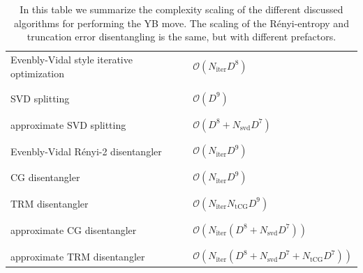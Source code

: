 \begin{table}
	\begin{tabular}{ l | l }
		Evenbly-Vidal style iterative optimization & $\mathcal{O}(N_\text{iter}D^8)$ \\ \\[-1em]
		\hline \\[-1em]
		SVD splitting & $\mathcal{O}(D^9)$ \\ \\[-1em]
		\hline \\[-1em]
		approximate SVD splitting & $\mathcal{O}(D^8 + N_\text{svd}D^7)$ \\ \\[-1em]
		\hline
		\hline \\[-1em]
		Evenbly-Vidal Rényi-2 disentangler  & $\mathcal{O}(N_\text{iter}D^9)$ \\ \\[-1em]
		\hline \\[-1em]
		CG disentangler & $\mathcal{O}(N_\text{iter}D^9)$ \\ \\[-1em]
		\hline \\[-1em]
		TRM disentangler & $\mathcal{O}(N_\text{iter}N_\text{tCG}D^9)$ \\ \\[-1em]
		\hline \\[-1em]
		approximate CG disentangler & $\mathcal{O}(N_\text{iter}(D^8 + N_\text{svd}D^7))$ \\ \\[-1em]
		\hline \\[-1em]
		approximate TRM disentangler & $\mathcal{O}(N_\text{iter}(D^8 + N_\text{svd}D^7 + N_\text{tCG}D^7))$ \\
	\end{tabular}
	\caption{In this table we summarize the complexity scaling of the different discussed algorithms for performing the YB move. The scaling of the Rényi-entropy and truncation error disentangling is the same, but with different prefactors.}
	\label{table:computational_complexity_YB_move}
\end{table}
